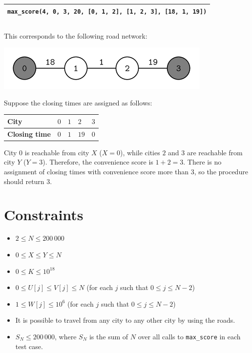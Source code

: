 \begin{center}
  \begin{tabular}{| l |}
    \hline
    \verb|max_score(4, 0, 3, 20, [0, 1, 2], [1, 2, 3], [18, 1, 19])| \\ \hline
  \end{tabular}
\end{center}

\begin{verbatim}
\end{verbatim}

This corresponds to the following road network:

\begin{center}
  \includegraphics[scale=0.7]{1.png}
\end{center}

Suppose the closing times are assigned as follows:

\begin{center}
  \noindent
  \begin{tabular}[H!]{| l | l | l | l | l |}
    \hline
    \textbf{City} & $0$ & $1$ & $2$ & $3$ \\ \hline
    \textbf{Closing time} & $0$ & $1$ & $19$ & $0$ \\ \hline
  \end{tabular}
\end{center}


City $0$ is reachable from city $X$ ($X = 0$), while cities $2$
and $3$ are reachable from city $Y$ ($Y = 3$). Therefore, the
convenience score is $1 + 2 = 3$. There is no assignment of closing
times with convenience score more than $3$, so the procedure should
return $3$.

\section*{Constraints}

\begin{itemize}
\item
  $2 \le N \le 200\,000$
\item
  $0 \le X \leq Y \leq N$
\item
  $0 \le K \le 10^{18}$
\item
  $0 \le U[j] \leq V[j] \leq N$ (for each $j$ such that
  $0 \le j \le N - 2$)
\item
  $1 \le W[j] \le 10^6$ (for each $j$ such that
  $0 \le j \le N - 2$)
\item
  It is possible to travel from any city to any other city by using the
  roads.
\item
  $S_N \le 200\,000$, where $S_N$ is the sum of $N$ over all calls
  to \texttt{max\_score} in each test case.
\end{itemize}

